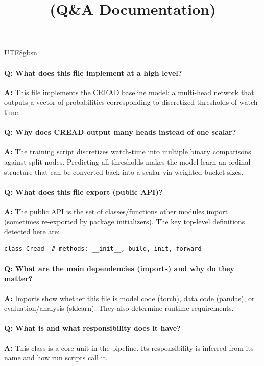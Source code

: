 \documentclass[11pt]{article}
\title{\texttt{\detokenize{model/cread.py}} (Q\&A Documentation)}
\author{}
\date{}
\begin{document}
\begin{CJK*}{UTF8}{gbsn}
\maketitle

\paragraph{Q: What does this file implement at a high level?}
\textbf{A:} This file implements the CREAD baseline model: a multi-head network that outputs a vector of probabilities corresponding to discretized thresholds of watch-time.

\paragraph{Q: Why does CREAD output many heads instead of one scalar?}
\textbf{A:} The training script discretizes watch-time into multiple binary comparisons against split nodes. Predicting all thresholds makes the model learn an ordinal structure that can be converted back into a scalar via weighted bucket sizes.

\paragraph{Q: What does this file export (public API)?}
\textbf{A:} The public API is the set of classes/functions other modules import (sometimes re-exported by package initializers). The key top-level definitions detected here are:

\begin{Verbatim}[fontsize=\small]
class Cread  # methods: __init__, build, init, forward
\end{Verbatim}

\paragraph{Q: What are the main dependencies (imports) and why do they matter?}
\textbf{A:} Imports show whether this file is model code (torch), data code (pandas), or evaluation/analysis (sklearn). They also determine runtime requirements.

\vspace{1mm}


\paragraph{Q: What is \texttt{} and what responsibility does it have?}
\textbf{A:} This class is a core unit in the pipeline. Its responsibility is inferred from its name and how run scripts call it.


\end{CJK*}
\end{document}
